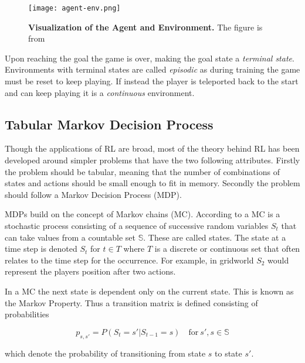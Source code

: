 \begin{figure}[H]
    \centering
    \texttt{[image: agent-env.png]}
    \captionsetup{width=.5\textwidth}
    \caption{\textbf{Visualization of the Agent and Environment.} The figure is from \citep[p.~48]{sutton_barto_2018}}
    \label{fig:agent-env}

\end{figure}


Upon reaching the goal the game is over, making the goal state a \textit{terminal state}. Environments with terminal states are called \textit{episodic} as during training the game must be reset to keep playing. If instead the player is teleported back to the start and can keep playing it is a \textit{continuous} environment.

\subsection{Tabular Markov Decision Process}

Though the applications of RL are broad, most of the theory behind RL has been developed around simpler problems that have the two following attributes. Firstly the problem should be tabular, meaning that the number of combinations of states and actions should be small enough to fit in memory. Secondly the problem should follow a Markov Decision Process (MDP). \cite[p.~23]{barto_sutton_1983}\citep[p.~57]{powell_2011} 

MDPs build on the concept of Markov chains (MC). According to \cite{ross_2014} a MC is a stochastic process consisting of a sequence of successive random variables $S_t$ that can take values from a countable set $\mathbb{S}$. These are called states. The state at a time step is denoted $S_t$ for $t \in T$ where $T$ is a discrete or continuous set that often relates to the time step for the occurrence. For example, in gridworld $S_2$ would represent the players position after two actions.

In a MC the next state is dependent only on the current state. This is known as the Markov Property. Thus a transition matrix is defined consisting of probabilities

\begin{equation}
    p_{s,s'} = P(S_t=s'|S_{t-1}=s) \quad \text{for} ~ s',s \in \mathbb{S}
\end{equation}

which denote the probability of transitioning from state $s$ to state $s'$.


